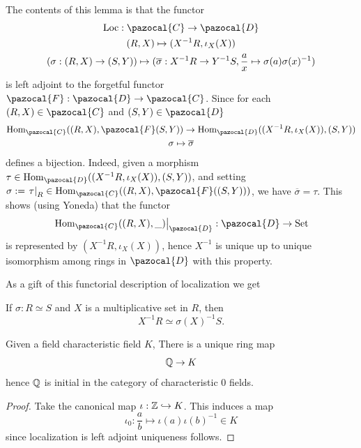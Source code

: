     \begin{remark}
        The contents of this lemma is that the functor
        \begin{gather*}
            \mathrm{Loc}: \pazocal{C}\rightarrow \pazocal{D}\\
            (R,X)\mapsto (X^{-1}R,\iota_X(X))\\
            (\sigma : (R,X)\rightarrow (S,Y))\mapsto (\overline{\sigma}: X^{-1}R\rightarrow Y^{-1}S,\frac{a}{x}\mapsto \sigma(a)\sigma(x)^{-1})
        \end{gather*}
        is left adjoint to the forgetful functor $\pazocal{F}: \pazocal{D}\rightarrow \pazocal{C}$. Since for each $(R,X)\in \pazocal{C}$ and $(S,Y)\in \pazocal{D}$ 
        \begin{gather*}
            \Hom_\pazocal{C}((R,X),\pazocal{F}(S,Y))\rightarrow \Hom_\pazocal{D}((X^{-1}R,\iota_X(X)),(S,Y))\\
            \sigma \mapsto \overline{\sigma} 
        \end{gather*}
        defines a bijection. Indeed, given a morphism $\tau\in \Hom_\pazocal{D}((X^{-1}R,\iota_X(X)),(S,Y))$, and setting $\sigma:=\left.\tau\right|_{R}\in \Hom_\pazocal{C}((R,X),\pazocal{F}((S,Y)))$, we have $\overline{\sigma}=\tau$. This shows (using Yoneda) that the functor
        $$
            \left.\Hom_\pazocal{C}((R,X),\_)\right|_\pazocal{D} : \pazocal{D}\rightarrow \mathrm{Set}
        $$
        is represented by $(X^{-1}R,\iota_X(X))$, hence $X^{-1}$ is unique up to unique isomorphism among rings in $\pazocal{D}$ with this property. 
    \end{remark}
    As a gift of this functorial description of localization we get
    \begin{corollary}
        If $\sigma: R\simeq S$ and $X$ is a multiplicative set in $R$, then 
        $$
            X^{-1}R\simeq \sigma(X)^{-1}S.
        $$
    \end{corollary}
    \begin{proposition}
        Given a field characteristic field $K$, There is a unique ring map 
        $$
            \mathbb{Q}\rightarrow K
        $$
        hence $\mathbb{Q}$ is initial in the category of characteristic $0$ fields. 
    \end{proposition}
    \begin{proof}
        Take the canonical map $\iota:\mathbb{Z}\hookrightarrow K$. This induces a map 
        $$
            \iota_0 : \frac{a}{b}\mapsto \iota(a)\iota(b)^{-1}\in K
        $$
        since localization is left adjoint uniqueness follows. 
    \end{proof}
    
